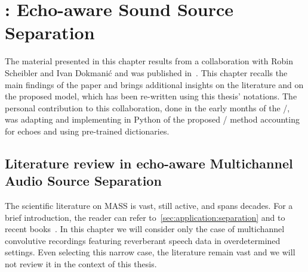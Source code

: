 \chapter{: Echo-aware Sound Source Separation}\label{ch:separake}

\vspace{-2.5em}
  \synopsisChSeparake

\mynewline
The material presented in this chapter results from a collaboration with Robin Scheibler and Ivan Dokmani\'{c} and was published in~\cite{scheibler2018separake}.
This chapter recalls the main findings of the paper and brings additional insights on the literature and on the proposed model, which has been re-written using this thesis' notations.
The personal contribution to this collaboration, done in the early months of the \PhD/, was adapting and implementing in Python of the proposed \NMF/ method accounting for echoes and using pre-trained dictionaries.

\section{Literature review in echo-aware Multichannel Audio Source Separation}\label{sec:separake:sota}
The scientific literature on \ac{MASS} is vast, still active, and spans decades.
For a brief introduction, the reader can refer to~\cref{sec:application:separation} and to recent books~.
In this chapter we will consider only the case of multichannel convolutive recordings featuring reverberant speech data in overdetermined settings.
Even selecting this narrow case, the literature remain vast and we will not review it in the context of this thesis.


